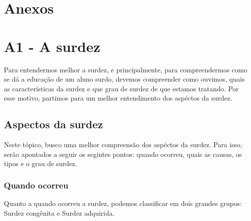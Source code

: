 \documentclass[brasil]{abnt}
\begin{document}
	
		

  

	\nocite{audi}
	\nocite{aud}
	\nocite{bev}
	\nocite{bot}
	\nocite{capo}
	\nocite{car}
	\nocite{coch}
	\nocite{cou}
	\nocite{dada}
	\nocite{Ubi}
	\nocite{amore}
	\nocite{dec}
	\nocite{fil}
	\nocite{gold}
	\nocite{kub}
	\nocite{lacerd}
	\nocite{lip}
	\nocite{machado}
	\nocite{PC}
	\nocite{macha}
	\nocite{martins}
	\nocite{mm}
	\nocite{moraes}
	\nocite{mon}
	\nocite{nogu}
	\nocite{nunes}
	\nocite{Wiki}
	\nocite{oliveira}
	\nocite{Almeida}
	\nocite{Paul}
	\nocite{pei}
	\nocite{crist}
	\nocite{phs}
	\nocite{quas}
	\nocite{qua}
	\nocite{qep}
	\nocite{quads}
	\nocite{rodr}
	\nocite{sado}
	\nocite{Sales}
	\nocite{san}
	\nocite{coelho}
	\nocite{sp}
	\nocite{ei}
	\nocite{silva}
	\nocite{soares}
	\nocite{sou}
	\nocite{stro}
	\nocite{qes}
	\nocite{vs}
	\nocite{vieira}
    
\chapter*{Anexos}

\chapter*{A1 - A surdez}
	Para entendermos melhor a surdez, e principalmente, para compreendermos como se dá a educação de um aluno surdo, devemos compreender como ouvimos, quais as características da surdez e 
	que grau de surdez de que estamos tratando. Por esse motivo, partimos para um melhor entendimento dos aspéctos da surdez.	
			
		\section{Aspectos da surdez}
			Neste tópico, busco uma melhor compreensão dos aspéctos da surdez. Para isso, serão apontados a seguir os segintes pontos: quando ocorreu, 
			quais as causas, os tipos e o grau de surdez. 
			
			\subsection{Quando ocorreu}
				Quanto a quando ocorreu a surdez, podemos classificar em dois grandes grupos: Surdez congênita e Surdez adquirida. 
				
\end{document}
